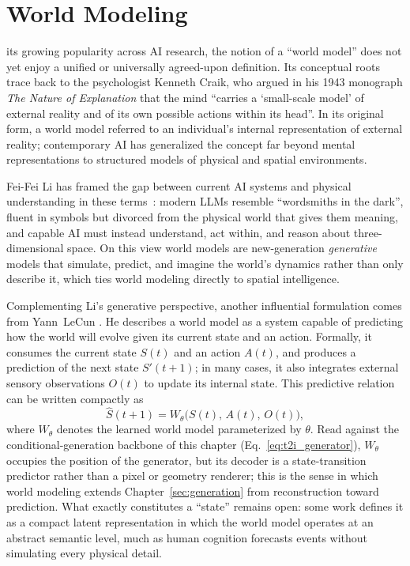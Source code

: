 

\section{World Modeling}
\label{sec:worldmodeling}
\label{sec:p3_s8_6}

 its growing popularity across AI research, the notion of a ``world model'' does not yet enjoy a unified or universally agreed-upon definition.
Its conceptual roots trace back to the psychologist Kenneth Craik, who argued in his 1943 monograph \emph{The Nature of Explanation} that the mind ``carries a `small-scale model' of external reality and of its own possible actions within its head''.
In its original form, a world model referred to an individual's internal representation of external reality; contemporary AI has generalized the concept far beyond mental representations to structured models of physical and spatial environments.

Fei-Fei Li has framed the gap between current AI systems and physical understanding in these terms~\cite{Feifei2025spatial}: modern LLMs resemble ``wordsmiths in the dark'', fluent in symbols but divorced from the physical world that gives them meaning, and capable AI must instead understand, act within, and reason about three-dimensional space. On this view world models are new-generation \emph{generative} models that simulate, predict, and imagine the world's dynamics rather than only describe it, which ties world modeling directly to spatial intelligence.



Complementing Li's generative perspective, another influential formulation comes from Yann~LeCun \cite{lecun2022path}. He describes a world model as a system capable of predicting how the world will evolve given its current state and an action.
Formally, it consumes the current state $S(t)$ and an action $A(t)$, and produces a prediction of the next state $S'(t+1)$; in many cases, it also integrates external sensory observations $O(t)$ to update its internal state.
This predictive relation can be written compactly as
\begin{equation}
\label{eq:p3_s8_6_transition}
\hat{S}(t+1) = W_\theta\big(S(t),\, A(t),\, O(t)\big),
\end{equation}
where $W_\theta$ denotes the learned world model parameterized by $\theta$.
Read against the conditional-generation backbone of this chapter (Eq.~\eqref{eq:t2i_generator}), $W_\theta$ occupies the position of the generator, but its decoder is a state-transition predictor rather than a pixel or geometry renderer; this is the sense in which world modeling extends Chapter~\ref{sec:generation} from reconstruction toward prediction.
What exactly constitutes a ``state'' remains open: some work defines it as a compact latent representation in which the world model operates at an abstract semantic level, much as human cognition forecasts events without simulating every physical detail.




